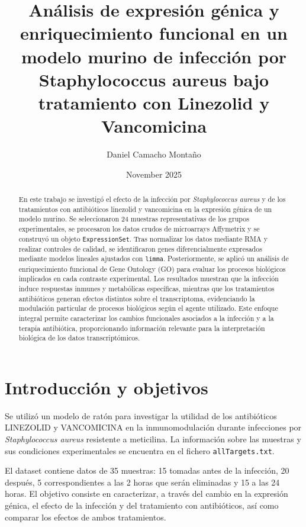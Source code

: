 \documentclass[12pt,a4paper]{article}
\title{Análisis de expresión génica y enriquecimiento funcional en un modelo murino de infección por Staphylococcus aureus bajo tratamiento con Linezolid y Vancomicina}
\author{Daniel Camacho Montaño}
\date{November 2025}
\begin{document}
 
\maketitle

\begin{abstract}
En este trabajo se investigó el efecto de la infección por \textit{Staphylococcus aureus} y de los tratamientos con antibióticos linezolid y vancomicina en la expresión génica de un modelo murino. Se seleccionaron 24 muestras representativas de los grupos experimentales, se procesaron los datos crudos de microarrays Affymetrix y se construyó un objeto \texttt{ExpressionSet}. Tras normalizar los datos mediante RMA y realizar controles de calidad, se identificaron genes diferencialmente expresados mediante modelos lineales ajustados con \texttt{limma}. Posteriormente, se aplicó un análisis de enriquecimiento funcional de Gene Ontology (GO) para evaluar los procesos biológicos implicados en cada contraste experimental. Los resultados muestran que la infección induce respuestas inmunes y metabólicas específicas, mientras que los tratamientos antibióticos generan efectos distintos sobre el transcriptoma, evidenciando la modulación particular de procesos biológicos según el agente utilizado. Este enfoque integral permite caracterizar los cambios funcionales asociados a la infección y a la terapia antibiótica, proporcionando información relevante para la interpretación biológica de los datos transcriptómicos.
\end{abstract}


\newpage

\tableofcontents
\newpage

\section{Introducción y objetivos}

Se utilizó un modelo de ratón para investigar la utilidad de los antibióticos LINEZOLID y VANCOMICINA en la inmunomodulación durante infecciones por \textit{Staphylococcus aureus} resistente a meticilina. La información sobre las muestras y sus condiciones experimentales se encuentra en el fichero \texttt{allTargets.txt}.

El dataset contiene datos de 35 muestras: 15 tomadas antes de la infección, 20 después, 5 correspondientes a las 2 horas que serán eliminadas y 15 a las 24 horas. El objetivo consiste en caracterizar, a través del cambio en la expresión génica, el efecto de la infección y del tratamiento con antibióticos, así como comparar los efectos de ambos tratamientos.
\end{document}
